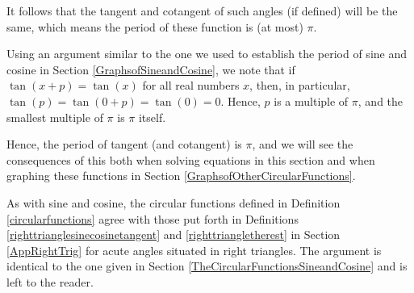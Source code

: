 \documentclass{ximera}
\begin{document}
\begin{image}
\end{image}

It follows that the tangent and cotangent of such angles (if defined) will be the same, which means the period of these function is (at most) $\pi$.  



Using an argument similar to the one we used to establish the period of sine and cosine in Section \ref{GraphsofSineandCosine}, we note that if $\tan(x+p) = \tan(x)$ for all real numbers $x$, then, in particular,   $\tan(p) = \tan(0+p) = \tan(0) = 0$.  Hence,  $p$ is a multiple of $\pi$, and the smallest multiple of $\pi$ is $\pi$ itself.  



Hence, the period of tangent (and cotangent) is $\pi$, and we will see the consequences of this both when solving equations in this section and when graphing these functions in Section \ref{GraphsofOtherCircularFunctions}.

  

As with sine and cosine, the circular functions defined in Definition \ref{circularfunctions}  agree with those put forth in Definitions \ref{righttrianglesinecosinetangent} and \ref{righttriangletherest} in Section \ref{AppRightTrig} for acute angles situated in right triangles.  The argument is identical to the one given in Section \ref{TheCircularFunctionsSineandCosine} and is left to the reader.  
\end{document}
